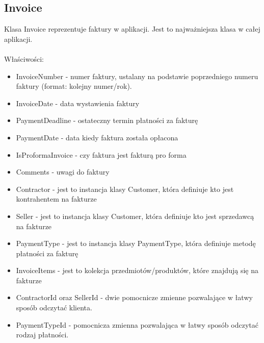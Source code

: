 \subsection{Invoice}
Klasa Invoice reprezentuje faktury w aplikacji. Jest to najważniejsza klasa w całej aplikacji.
\\\\
Właściwości:
\begin{itemize}
    \item InvoiceNumber - numer faktury, ustalany na podstawie poprzedniego numeru faktury (format: kolejny numer/rok).
    \item InvoiceDate - data wystawienia faktury
    \item PaymentDeadline - ostateczny termin płatności za fakturę
    \item PaymentDate - data kiedy faktura została opłacona
    \item IsProformaInvoice - czy faktura jest fakturą pro forma
    \item Comments - uwagi do faktury
    \item Contractor - jest to instancja klasy Customer, która definiuje kto jest kontrahentem na fakturze
    \item Seller - jest to instancja klasy Customer, która definiuje kto jest sprzedawcą na fakturze
    \item PaymentType - jest to instancja klasy PaymentType, która definiuje metodę płatności za fakturę
    \item InvoiceItems - jest to kolekcja przedmiotów/produktów, które znajdują się na fakturze
    \item ContractorId oraz SellerId - dwie pomocnicze zmienne pozwalające w łatwy sposób odczytać klienta.
    \item PaymentTypeId - pomocnicza zmienna pozwalająca w łatwy sposób odczytać rodzaj płatności.
\end{itemize}

